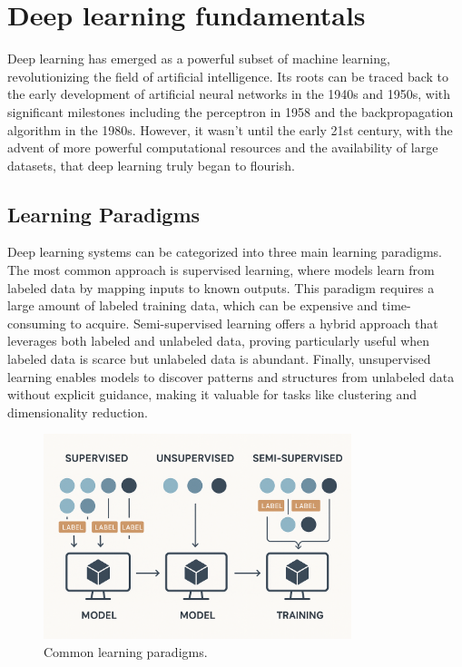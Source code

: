 \section{Deep learning fundamentals}

Deep learning has emerged as a powerful subset of machine learning,
revolutionizing the field of artificial intelligence. Its roots can
be traced back to the early development of artificial neural networks
in the 1940s and 1950s, with significant milestones including the
perceptron in 1958 and the backpropagation algorithm in the 1980s.
However, it wasn't until the early 21st century, with the advent of
more powerful computational resources and the availability of large
datasets, that deep learning truly began to flourish.

\subsection{Learning Paradigms}

Deep learning systems can be categorized into three main learning paradigms.
The most common approach is supervised learning, where models learn from
labeled data by mapping inputs to known outputs. This paradigm requires a
large amount of labeled training data, which can be expensive and
time-consuming to acquire. Semi-supervised learning offers a hybrid
approach that leverages both labeled and unlabeled data, proving
particularly useful when labeled data is scarce but unlabeled data is
abundant. Finally, unsupervised learning enables models to discover
patterns and structures from unlabeled data without explicit guidance,
making it valuable for tasks like clustering and dimensionality
reduction.

\begin{figure}[h]
  \centering
  \includegraphics[width=0.8\textwidth]{Cap2/Figures/supervised_paradigms.png}
  \caption{Common learning paradigms.}
  \label{fig:learning_paradigms}
\end{figure}

